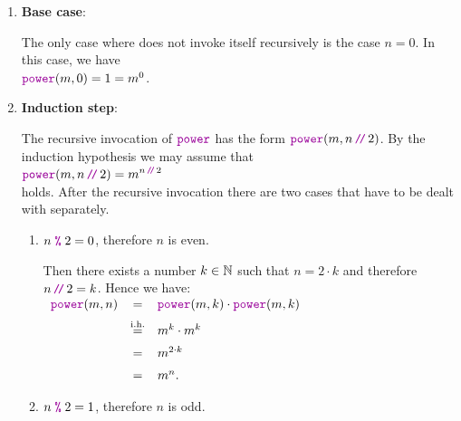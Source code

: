 \begin{enumerate}
\item \textbf{Base case}:

      The only case where  does not invoke itself recursively is the case $n = 0$.  
      In this case, we have
      \\[0.2cm]
      \hspace*{1.3cm} 
      $\mytt{power}(m,0) = 1 =  m^0$. \mycheck
\item \textbf{Induction step}:

      The recursive invocation of $\mytt{power}$ has the form
      $\mytt{power}(m,n \dv 2)$.  By the induction hypothesis we may assume that 
      \\[0.2cm]
      \hspace*{1.3cm}
      $\displaystyle \mytt{power}(m,n \dv 2) = m^{n \dvv 2}$ 
      \\[0.2cm]
      holds.  After the recursive invocation there are two cases that have to be dealt with separately.
      \begin{enumerate}
      \item $n \;\mytt{\%}\; 2 = 0$, therefore $n$ is even.

            Then there exists a number $k \in {\mathbb N}$ such that $n = 2 \cdot k$ and therefore
            $n \dv 2 = k$.
            Hence we have:
            \\[0.2cm]
            \hspace*{1.3cm}
           $ 
            \begin{array}{lcl}
            \mytt{power}(m,n) & = & \mytt{power}(m,k) \cdot \mytt{power}(m,k) \\[0.2cm]
                                & \stackrel{\mathrm{i.h.}}{=} & m^k \cdot m^k  \\[0.2cm]
                                & = & m^{2\cdot k} \\[0.2cm]
                                & = & m^{n}.
            \end{array}
            $            
      \item $n \;\mytt{\%}\; 2 = 1$, therefore $n$ is odd.


\end{enumerate}
\end{enumerate}
